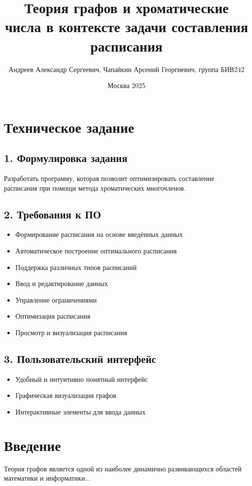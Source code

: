 \documentclass[a4paper,12pt]{article}
\title{Теория графов и хроматические числа в контексте задачи составления расписания}
\author{Андреев Александр Сергеевич, Чапайкин Арсений Георгиевич, группа БИВ242}
\date{Москва 2025}
\begin{document}
\maketitle

\section*{Техническое задание}

\subsection*{1. Формулировка задания}
Разработать программу, которая позволит оптимизировать составление расписания при помощи метода хроматических многочленов.

\subsection*{2. Требования к ПО}
\begin{itemize}
    \item Формирование расписания на основе введённых данных
    \item Автоматическое построение оптимального расписания
    \item Поддержка различных типов расписаний
    \item Ввод и редактирование данных
    \item Управление ограничениями
    \item Оптимизация расписания
    \item Просмотр и визуализация расписания
\end{itemize}

\subsection*{3. Пользовательский интерфейс}
\begin{itemize}
    \item Удобный и интуитивно понятный интерфейс
    \item Графическая визуализация графов
    \item Интерактивные элементы для ввода данных
\end{itemize}

\section*{Введение}
Теория графов является одной из наиболее динамично развивающихся областей математики и информатики...
\end{document}

